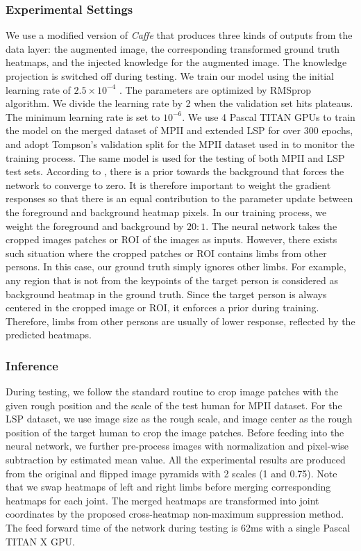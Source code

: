\documentclass[journal ]{IEEEtran}
\begin{document}
\subsubsection{Experimental Settings}
We use a modified version of \textit{Caffe}\cite{jia2014caffe} that produces three kinds of outputs from the data layer: the augmented image, the corresponding transformed ground truth heatmaps, and the injected knowledge for the augmented image. The knowledge projection is switched off during testing.  
We train our model using the initial learning rate of $2.5 \times 10^{-4}$ . The parameters are optimized by RMSprop \cite{tieleman2012lecture} algorithm. We divide the learning rate by 2 when the validation set hits plateaus. The minimum learning rate is set to $10^{-6}$.
We use 4 Pascal TITAN GPUs to train the model on the merged dataset of MPII and extended LSP for over $300$ epochs, and adopt Tompson's validation split for the MPII dataset used in \cite{tompson2014joint} to monitor the training process.
The same model is used for the testing of both MPII and LSP test sets.
According to \cite{pinheiro2014recurrent}, there is a prior towards the background that forces the network to converge to zero. It is therefore important to weight the gradient responses so that there is an equal contribution to the parameter update between the foreground and background heatmap pixels. In our training process, we weight the foreground and background by $20:1$. 
The neural network takes the cropped images patches or ROI of the images as inputs. However, there exists such situation where the cropped patches or ROI contains limbs from other persons. In this case, our ground truth simply ignores other limbs. For example, any region that is not from the keypoints of the target person is considered as background heatmap in the ground truth. Since the target person is always centered in the cropped image or ROI, it enforces a prior during training. Therefore, limbs from other persons are usually of lower response, reflected by the predicted heatmaps. 

\subsubsection{Inference}
During testing, we follow the standard routine to crop image patches with the given rough position and the scale of the test human for MPII dataset. For the LSP dataset, we use image size as the rough scale, and image center as the rough position of the target human to crop the image patches.
Before feeding into the neural network, we further pre-process images with normalization and pixel-wise subtraction by estimated mean value. 
All the experimental results are produced from the original and flipped image pyramids with 2 scales (1 and 0.75). Note that we swap heatmaps of left and right limbs before merging corresponding heatmaps for each joint. The merged heatmaps are transformed into joint coordinates by the proposed cross-heatmap non-maximum suppression method. 
The feed forward time of the network during testing is 62ms with a single Pascal TITAN X GPU.
\end{document}
